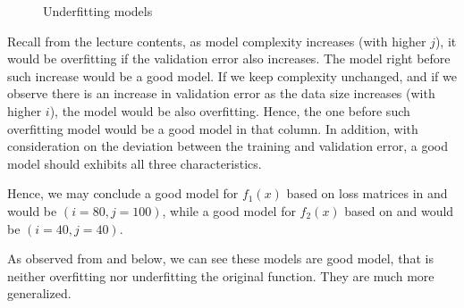 \documentclass{tron}
\begin{document}
\begin{figure}[H]
	\centering
	\caption{Underfitting models\label{fig:p3:2:underfit}}
\end{figure}

Recall from the lecture contents, as model complexity increases (with higher $j$), it would be overfitting if the validation error also increases. The model right before such increase would be a good model. If we keep complexity unchanged, and if we observe there is an increase in validation error as the data size increases (with higher $i$), the model would be also overfitting. Hence, the one before such overfitting model would be a good model in that column. In addition, with consideration on the deviation between the training and validation error, a good model should exhibits all three characteristics.

Hence, we may conclude a good model for $f_1(x)$ based on loss matrices in  and  would be $(i=80, j=100)$, while a good model for $f_2(x)$ based on  and  would be $(i=40, j=40)$. 


As observed from  and  below, we can see these models are good model, that is neither overfitting nor underfitting the original function. They are much more generalized.
\end{document}
